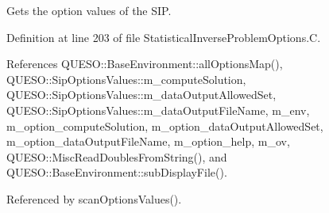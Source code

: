 Gets the option values of the S\-I\-P. 



Definition at line 203 of file Statistical\-Inverse\-Problem\-Options.\-C.



References Q\-U\-E\-S\-O\-::\-Base\-Environment\-::all\-Options\-Map(), Q\-U\-E\-S\-O\-::\-Sip\-Options\-Values\-::m\-\_\-compute\-Solution, Q\-U\-E\-S\-O\-::\-Sip\-Options\-Values\-::m\-\_\-data\-Output\-Allowed\-Set, Q\-U\-E\-S\-O\-::\-Sip\-Options\-Values\-::m\-\_\-data\-Output\-File\-Name, m\-\_\-env, m\-\_\-option\-\_\-compute\-Solution, m\-\_\-option\-\_\-data\-Output\-Allowed\-Set, m\-\_\-option\-\_\-data\-Output\-File\-Name, m\-\_\-option\-\_\-help, m\-\_\-ov, Q\-U\-E\-S\-O\-::\-Misc\-Read\-Doubles\-From\-String(), and Q\-U\-E\-S\-O\-::\-Base\-Environment\-::sub\-Display\-File().



Referenced by scan\-Options\-Values().


